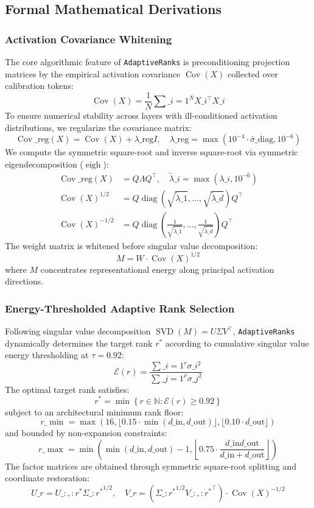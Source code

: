 \subsection{Formal Mathematical Derivations}

\subsubsection{Activation Covariance Whitening}
\label{sec:covariance_whitening}
The core algorithmic feature of \texttt{AdaptiveRanks} is preconditioning projection matrices by the empirical activation covariance $\operatorname{Cov}(X)$ collected over calibration tokens:
\[
\operatorname{Cov}(X) = \frac{1}{N} \sum\_{i=1}^N X\_i^\top X\_i
\]
To ensure numerical stability across layers with ill-conditioned activation distributions, we regularize the covariance matrix:
\[
\operatorname{Cov}\_{\text{reg}}(X) = \operatorname{Cov}(X) + \lambda\_{\text{reg}} I, \quad \lambda\_{\text{reg}} = \max(10^{-4} \cdot \bar{\sigma}\_{\text{diag}}, 10^{-6})
\]
We compute the symmetric square-root and inverse square-root via symmetric eigendecomposition ($\operatorname{eigh}$):
\begin{align}
\operatorname{Cov}\_{\text{reg}}(X) &= Q \Lambda Q^\top, \quad \tilde{\lambda}\_i = \max(\lambda\_i, 10^{-6}) \\
\operatorname{Cov}(X)^{1/2} &= Q \operatorname{diag}\left(\sqrt{\tilde{\lambda}\_1}, \dots, \sqrt{\tilde{\lambda}\_d}\right) Q^\top \\
\operatorname{Cov}(X)^{-1/2} &= Q \operatorname{diag}\left(\frac{1}{\sqrt{\tilde{\lambda}\_1}}, \dots, \frac{1}{\sqrt{\tilde{\lambda}\_d}}\right) Q^\top
\end{align}
The weight matrix is whitened before singular value decomposition:
\[
M = W \cdot \operatorname{Cov}(X)^{1/2}
\]
where $M$ concentrates representational energy along principal activation directions.

\subsubsection{Energy-Thresholded Adaptive Rank Selection}
\label{sec:adaptive_rank_selection}
Following singular value decomposition $\operatorname{SVD}(M) = U \Sigma V^\top$, \texttt{AdaptiveRanks} dynamically determines the target rank $r^*$ according to cumulative singular value energy thresholding at $\tau = 0.92$:
\[
\mathcal{E}(r) = \frac{\sum\_{i=1}^r \sigma\_i^2}{\sum\_{j=1}^\rho \sigma\_j^2}
\]
The optimal target rank satisfies:
\[
r^* = \min \left\{ r \in \mathbb{N} : \mathcal{E}(r) \ge 0.92 \right\}
\]
subject to an architectural minimum rank floor:
\[
r\_{\min} = \max\left(16, \lfloor 0.15 \cdot \min(d\_{\text{in}}, d\_{\text{out}})\rfloor, \lfloor 0.10 \cdot d\_{\text{out}}\rfloor\right)
\]
and bounded by non-expansion constraints:
\[
r\_{\max} = \min\left(\min(d\_{\text{in}}, d\_{\text{out}}) - 1, \left\lfloor 0.75 \cdot \frac{d\_{\text{in}} d\_{\text{out}}}{d\_{\text{in}} + d\_{\text{out}}}\right\rfloor\right)
\]
The factor matrices are obtained through symmetric square-root splitting and coordinate restoration:
\[
U\_r = U\_{:, :r^*} \Sigma\_{:r^*}^{1/2}, \quad V\_r = \left(\Sigma\_{:r^*}^{1/2} V\_{:, :r^*}^\top\right) \cdot \operatorname{Cov}(X)^{-1/2}
\]


